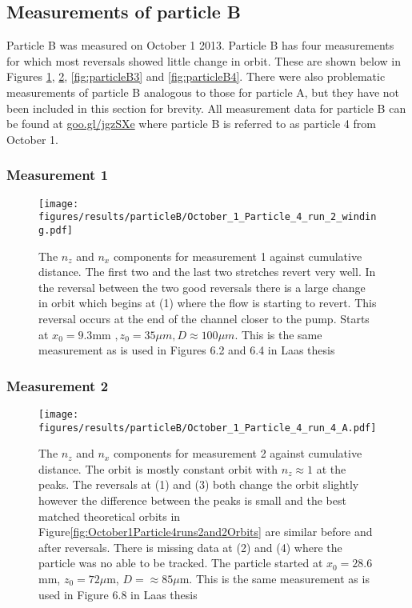\subsection{Measurements of particle B}
Particle B was measured on October 1 2013. Particle B has four measurements for which most reversals showed little change in orbit. These are shown below in Figures \ref{fig:particleB1}, \ref{fig:particleB2}, \ref{fig:particleB3} and \ref{fig:particleB4}. There were also problematic measurements of particle B analogous to those for particle A, but they have not been included in this section for brevity. All measurement data for particle B can be found at \url{goo.gl/jgzSXe} where particle B is referred to as particle 4 from October 1. 

\subsubsection{Measurement 1}
\begin{figure}[H]
\begin{center}
\texttt{[image: figures/results/particleB/October\_1\_Particle\_4\_run\_2\_winding.pdf]}
\end{center}
\caption{The $n_z$ and $n_x$ components for measurement 1 against cumulative distance. The first two and the last two stretches revert very well. In the reversal between the two good reversals there is a large change in orbit which begins at (1) where the flow is starting to revert. This reversal occurs at the end of the channel closer to the pump. Starts at $ x_0 = 9.3$mm $,z_0 = 35\mu m, D \approx 100\mu m$. This is the same measurement as is used in Figures 6.2 and 6.4 in Laas thesis~\cite{alexanderThesis}}
\label{fig:particleB1}
\end{figure}
	


\subsubsection{Measurement 2}

\begin{figure}[H]
\begin{center}
\texttt{[image: figures/results/particleB/October\_1\_Particle\_4\_run\_4\_A.pdf]}
\end{center}
\caption{The $n_z$ and $n_x$ components for measurement 2 against cumulative distance. The orbit is mostly constant orbit with $n_z \approx 1$ at the peaks. The reversals at (1) and (3) both change the orbit slightly however the difference between the peaks is small and the best matched theoretical orbits in Figure\ref{fig:October1Particle4runs2and2Orbits} are similar before and after reversals. There is missing data at (2) and (4) where the particle was no able to be tracked. The particle started at $x_0 = 28.6$mm, $z_0 = 72\mu$m, $D = \approx 85\mu$m. This is the same measurement as is used in Figure 6.8 in Laas thesis~\cite{alexanderThesis}}
\label{fig:particleB2}
\end{figure}

